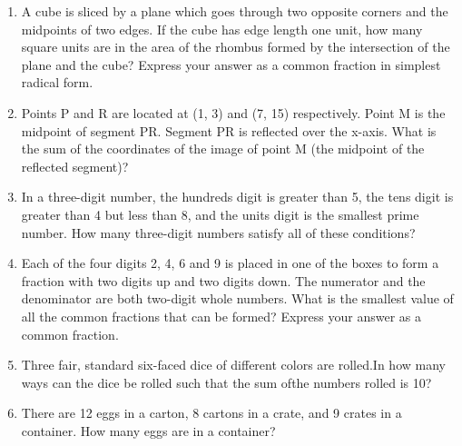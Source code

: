 \documentclass[12pt]{article}
\begin{document}
\begin{enumerate}
\vspace{1cm}

\item A cube is sliced by a plane which goes through two opposite
corners and the midpoints of two edges. If the cube
has edge length one unit, how many square units are in the area
of the rhombus formed by the intersection of the plane and the
cube? Express your answer as a common fraction in simplest
radical form.
\vspace{1cm}

\item Points P and R are located at (1, 3) and (7, 15) respectively.
Point M is the midpoint of segment PR. Segment PR is
reflected over the x-axis. What is the sum of the coordinates of
the image of point M (the midpoint of the reflected segment)?
\vspace{1cm}

\item In a three-digit number, the hundreds digit is greater than 5, the
tens digit is greater than 4 but less than 8, and the units digit is
the smallest prime number. How many three-digit numbers
satisfy all of these conditions?
\vspace{1cm}
\item Each of the four digits 2, 4, 6 and 9 is placed in one of the
boxes to form a fraction with two digits up and two digits down.
The numerator and
the denominator are both two-digit whole numbers. What is
the smallest value of all the common fractions that can be
formed? Express your answer as a common fraction.
\vspace{1cm}


\item Three fair, standard six-faced dice of different colors are rolled.In how many ways can the dice be rolled such that the sum ofthe numbers rolled is 10?

\vspace{1cm}


\item There are 12 eggs in a carton, 8 cartons in a crate, and 9 crates in a container.
How many eggs are in a container?

\vspace{1cm}


\end{enumerate}
\end{document}
